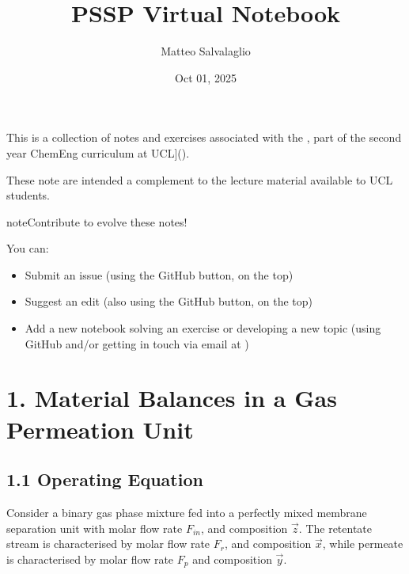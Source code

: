 \documentclass[letterpaper,10pt,english]{jupyterBook}
\title{PSSP Virtual Notebook}
\date{Oct 01, 2025}
\author{Matteo Salvalaglio}
\begin{document}
\pagestyle{empty}
\sphinxmaketitle
\pagestyle{plain}
\sphinxtableofcontents
\pagestyle{normal}
\label{\detokenize{index::doc}}


\sphinxAtStartPar
This is a collection of notes and exercises associated with the , part of the second year ChemEng curriculum at UCL{]}().

\sphinxAtStartPar
These note are intended a complement to the lecture material available to UCL students.

\begin{sphinxadmonition}{note}{Contribute to evolve these notes!}

\sphinxAtStartPar
You can:
\begin{itemize}
\item {} 
\sphinxAtStartPar
Submit an issue (using the GitHub button, on the top)

\item {} 
\sphinxAtStartPar
Suggest an edit (also using the GitHub button, on the top)

\item {} 
\sphinxAtStartPar
Add a new notebook solving an exercise or developing a new topic (using GitHub and/or getting in touch via email at )

\end{itemize}
\end{sphinxadmonition}

\sphinxstepscope


\section{1. Material Balances in a Gas Permeation Unit}
\label{\detokenize{Gas_permeation:material-balances-in-a-gas-permeation-unit}}\label{\detokenize{Gas_permeation::doc}}

\subsection{1.1 Operating Equation}
\label{\detokenize{Gas_permeation:operating-equation}}
\sphinxAtStartPar
Consider a binary gas phase mixture fed into a perfectly mixed membrane separation unit with molar flow rate \(F_{in}\), and composition \(\vec{z}\). The retentate stream is characterised by molar flow rate \(F_{r}\), and composition \(\vec{x}\), while  permeate is characterised by molar flow rate \(F_{p}\)  and composition \(\vec{y}\).
\end{document}
